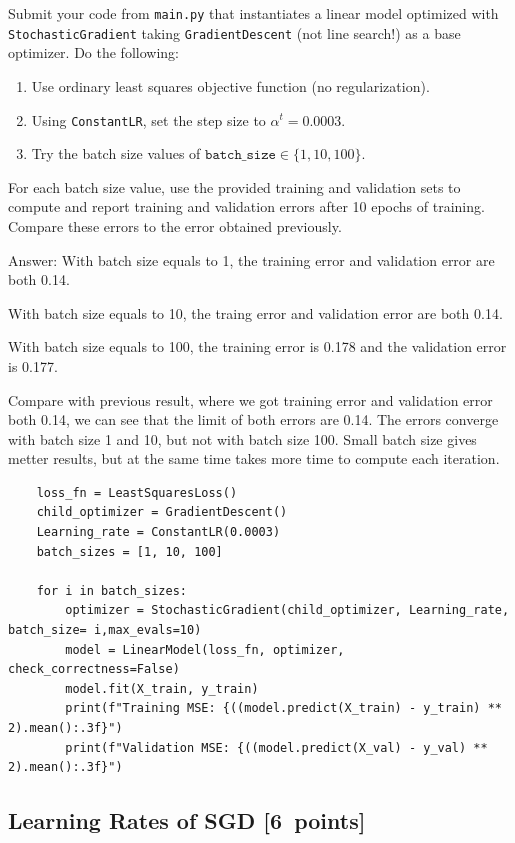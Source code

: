 \documentclass{article}
\newcommand{\blu}[1]{{\textcolor{blu}{#1}}}
\newenvironment{answer}{\par\begingroup\color{gre}Answer: }{\endgroup}
\let\ask\blu
\newcommand\pts[1]{\textcolor{pointscolour}{[#1~points]}}
\begin{document}
\ask{Submit your code} from \texttt{main.py} that instantiates a linear model optimized with \texttt{StochasticGradient} taking \texttt{GradientDescent} (not line search!) as a base optimizer. Do the following:
\begin{enumerate}
		\item Use ordinary least squares objective function (no regularization).
		\item Using \texttt{ConstantLR}, set the step size to $\alpha^t = 0.0003$.
		\item Try the batch size values of $\texttt{batch\_size} \in \{1, 10, 100\}$.
\end{enumerate}
\ask{For each batch size value, use the provided training and validation sets to compute and report training and validation errors after 10 epochs of training. Compare these errors to the error obtained previously.}
\begin{answer}
	With batch size equals to 1, the training error and validation error are both 0.14.

	With batch size equals to 10, the traing error and validation error are both 0.14.

	With batch size equals to 100, the training error is 0.178 and the validation error is 0.177.

	Compare with previous result, where we got training error and validation error both 0.14, we can see that the limit of both errors are 0.14. The errors converge with batch size 1 and 10, but not with batch size 100. Small batch size gives metter results, but at the same time takes more time to compute each iteration.

	\begin{verbatim}
    loss_fn = LeastSquaresLoss()
    child_optimizer = GradientDescent()
    Learning_rate = ConstantLR(0.0003)
    batch_sizes = [1, 10, 100]

    for i in batch_sizes:
        optimizer = StochasticGradient(child_optimizer, Learning_rate, batch_size= i,max_evals=10)
        model = LinearModel(loss_fn, optimizer, check_correctness=False)
        model.fit(X_train, y_train)
        print(f"Training MSE: {((model.predict(X_train) - y_train) ** 2).mean():.3f}")
        print(f"Validation MSE: {((model.predict(X_val) - y_val) ** 2).mean():.3f}")
	\end{verbatim}
\end{answer}


\subsection{Learning Rates of SGD \pts{6}}
\end{document}
